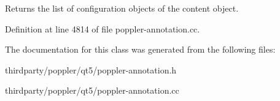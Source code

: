 Returns the list of configuration objects of the content object. 

Definition at line 4814 of file poppler-\/annotation.\+cc.



The documentation for this class was generated from the following files\+:\begin{DoxyCompactItemize}
\item 
thirdparty/poppler/qt5/poppler-\/annotation.\+h\item 
thirdparty/poppler/qt5/poppler-\/annotation.\+cc\end{DoxyCompactItemize}

